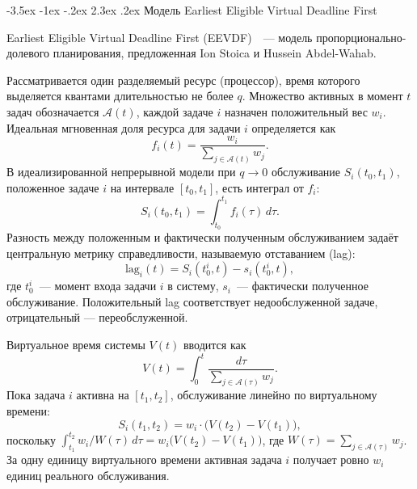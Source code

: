 \documentclass[14pt, oneside]{extbook}
\makeatletter
\renewcommand\section{\@startsection {section}{1}{\z@}%
                                   {-3.5ex \@plus -1ex \@minus -.2ex}%
                                   {2.3ex \@plus.2ex}%
                                   {\normalfont\fontsize{16}{20}\selectfont\bfseries}}
\makeatother
\begin{document}
\section{Модель Earliest Eligible Virtual Deadline First}\label{sec:eevdf}

        \begin{sloppypar}
                Earliest Eligible Virtual Deadline First
                (EEVDF)~\cite{stoica}~--- модель
                пропорционально-долевого планирования, предложенная
                Ion Stoica и Hussein Abdel-Wahab.
        \end{sloppypar}

        Рассматривается один разделяемый ресурс
        (процессор), время которого выделяется квантами длительностью
        не более $q$. Множество активных в момент $t$ задач
        обозначается $\mathcal{A}(t)$, каждой задаче $i$ назначен
        положительный вес $w_i$. Идеальная мгновенная доля ресурса
        для задачи $i$ определяется как
        \begin{equation*}
                f_i(t) = \frac{w_i}{\sum_{j \in \mathcal{A}(t)} w_j}.
        \end{equation*}
        В идеализированной непрерывной модели при $q \to 0$
        обслуживание $S_i(t_0, t_1)$, положенное задаче $i$
        на интервале $[t_0, t_1]$, есть интеграл от $f_i$:
        \begin{equation*}
                S_i(t_0, t_1) = \int_{t_0}^{t_1} f_i(\tau)\, d\tau.
        \end{equation*}
        Разность между положенным и фактически полученным
        обслуживанием задаёт центральную метрику справедливости,
        называемую отставанием (lag):
        \begin{equation*}
                \mathrm{lag}_i(t) = S_i(t_0^i, t) - s_i(t_0^i, t),
        \end{equation*}
        где $t_0^i$~--- момент входа задачи $i$ в систему,
        $s_i$~--- фактически полученное обслуживание.
        Положительный lag соответствует недообслуженной задаче,
        отрицательный --- переобслуженной.

        Виртуальное время системы $V(t)$ вводится как
        \begin{equation}\label{eq:V}
                V(t) = \int_0^t \frac{d\tau}{\sum_{j \in
                \mathcal{A}(\tau)} w_j}.
        \end{equation}
        Пока задача $i$ активна на $[t_1, t_2]$, обслуживание
        линейно по виртуальному времени:
        \begin{equation*}
                S_i(t_1, t_2) = w_i \cdot \bigl(V(t_2) - V(t_1)\bigr),
        \end{equation*}
        поскольку $\int_{t_1}^{t_2} w_i/W(\tau)\,d\tau =
        w_i\bigl(V(t_2)-V(t_1)\bigr)$, где
        $W(\tau) = \sum_{j \in \mathcal{A}(\tau)} w_j$.
        За одну единицу виртуального времени активная задача $i$
        получает ровно $w_i$ единиц реального обслуживания.
\end{document}

